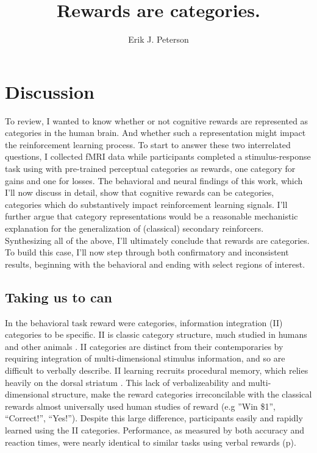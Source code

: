 \documentclass[doc,12pt]{apa}        %
\title{Rewards are categories.}
\author{Erik J. Peterson} \affiliation{Dept. of Psychology \\ Colorado State University \\ Fort Collins, CO}
\begin{document}
 
\maketitle
\doublespacing
\section{Discussion} %
\label{sec:dicussion}
To review, I wanted to know whether or not cognitive rewards are represented as categories in the human brain.  And whether such a representation might impact the reinforcement learning process.  To start to answer these two interrelated questions, I collected fMRI data while participants completed a stimulus-response task using with pre-trained perceptual categories as rewards, one category for gains and one for losses.  The behavioral and neural findings of this work, which I'll now discuss in detail, show that cognitive rewards can be categories, categories which do substantively impact reinforcement learning signals.  I'll further argue that category representations would be a reasonable mechanistic explanation for the generalization of (classical) secondary reinforcers.  Synthesizing all of the above, I'll ultimately conclude that rewards are categories.  To build this case, I'll now step through both confirmatory and inconsistent results, beginning with the behavioral and ending with select regions of interest.

\subsection{Taking us to can}
\label{sub:tocan}
In the behavioral task reward were categories, information integration (II) categories to be specific.  II is classic category structure, much studied in humans and other animals \cite{Smith:2011p9101,Ashby:2011p9148,Smith:2010p9713}.  II categories are distinct from their contemporaries by requiring integration of multi-dimensional stimulus information, and so are difficult to verbally describe. II learning recruits procedural memory, which relies heavily on the dorsal striatum \cite{Ashby:1998p9716}.   This lack of verbalizeability and multi-dimensional structure, make the reward categories irreconcilable with the classical rewards almost universally used human studies of reward (e.g ''Win \$1'', ``Correct!'', ``Yes!'').  Despite this large difference, participants easily and rapidly learned using the II categories.  Performance, as measured by both accuracy and reaction times, were nearly identical to similar tasks using verbal rewards (p\pageref{subsub:wellbehaved}).  
\end{document}
